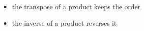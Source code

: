 \begin{itemize}
\item the transpose of a product keeps the order
\item the inverse of a product reverses it
\end{itemize}

